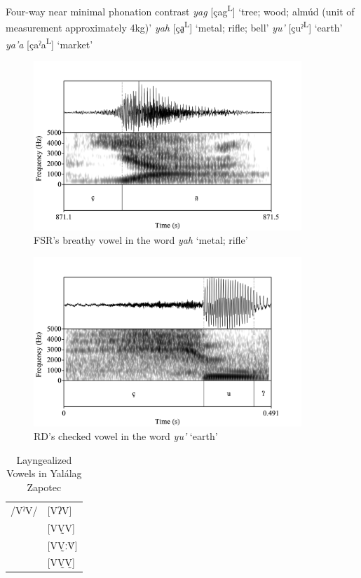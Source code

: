 \documentclass[12pt, letterpaper]{article}
\newcommand{\supr}[1]{\textsuperscript{#1}}
\providecommand{\lsptoprule}{\midrule\toprule}
\providecommand{\lspbottomrule}{\bottomrule\midrule}
\begin{document}
\ea \label{ex:YA} Four-way near minimal phonation contrast
	\ea \textit{yag}  [çag\supr{L}] `tree; wood; almúd (unit of measurement approximately 4kg)'
	\ex \textit{yah}  [ça̤\supr{L}] `metal; rifle; bell'
	\ex \textit{yu'}  [çuˀ\supr{L}]  `earth'
	\ex \textit{ya'a}  [çaˀa\supr{L}]  `market'
	\z 
\z 

\begin{figure}[!h]
	\centering
	\includegraphics[width=0.9\textwidth]{../yah.png}
	\caption{FSR's breathy vowel in the word \textit{yah} `metal; rifle'}
	\label{fig:BreathyVowel}
\end{figure}

\begin{figure}[!h]
	\centering
	\includegraphics[width=0.9\textwidth]{../RD_yu'.png}
	\caption{RD's checked vowel in the word \textit{yu'} `earth'}
	\label{fig:CheckedVowel}
\end{figure}

\begin{table}[!h]
	\centering
	\caption{Layngealized Vowels in Yalálag Zapotec}
	\label{tab:laryngeal}
	 \begin{tabular}{ll}
	\lsptoprule
	/VˀV/	&  [VʔV]  \\
			&  [VV̰V]   \\
			&  [VV̰ːV̆]  \\
			&  [VV̰V̰]	\\
	\lspbottomrule
	\end{tabular}
\end{table}
\end{document}
